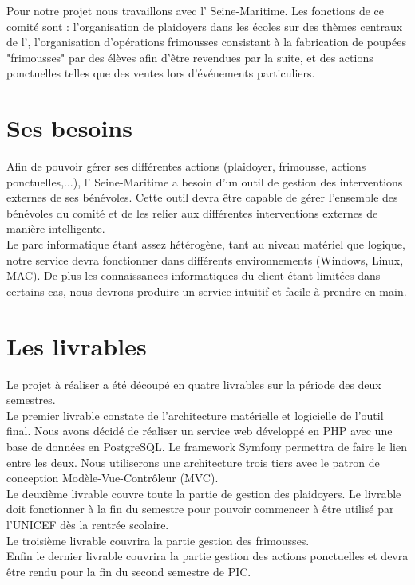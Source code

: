\documentclass[asi]{picInsa}
\begin{document}
Pour notre projet nous travaillons avec l'\nomClient{} Seine-Maritime. Les fonctions de ce comité sont : l'organisation de plaidoyers dans les écoles sur des thèmes centraux de l'\nomClient, l'organisation d'opérations frimousses consistant à la fabrication de poupées "frimousses" par des élèves afin d'être revendues par la suite, et des actions ponctuelles telles que des ventes lors d’événements particuliers.

\section{Ses besoins}
Afin de pouvoir gérer ses différentes actions (plaidoyer, frimousse, actions ponctuelles,...), l'\nomClient{} Seine-Maritime a besoin d'un outil de gestion des interventions externes de ses bénévoles. Cette outil devra être capable de gérer l'ensemble des bénévoles du comité et de les relier aux différentes interventions externes de manière intelligente.\\
Le parc informatique étant assez hétérogène, tant au niveau matériel que logique, notre service devra fonctionner dans différents environnements (Windows, Linux, MAC). De plus les connaissances informatiques du client étant limitées dans certains cas, nous devrons produire un service intuitif et facile à prendre en main.

\section{Les livrables}
Le projet à réaliser a été découpé en quatre livrables sur la période des deux semestres.\vspace{0.5cm}\\
Le premier livrable constate de l'architecture matérielle et logicielle de l'outil final. Nous avons décidé de réaliser un service web développé en PHP avec une base de données en PostgreSQL. Le framework Symfony permettra de faire le lien entre les deux. Nous utiliserons une architecture trois tiers avec le patron de conception Modèle-Vue-Contrôleur (MVC).\vspace{0.5cm}\\
Le deuxième livrable couvre toute la partie de gestion des plaidoyers. Le livrable doit fonctionner à la fin du semestre pour pouvoir commencer à être utilisé par l'UNICEF dès la rentrée scolaire.\vspace{0.5cm}\\
Le troisième livrable couvrira la partie gestion des frimousses.\vspace{0.5cm}\\
Enfin le dernier livrable couvrira la partie gestion des actions ponctuelles et devra être rendu pour la fin du second semestre de PIC.
\end{document}

